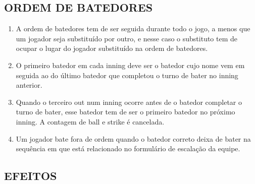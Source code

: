 \subsection{ORDEM DE BATEDORES }
\begin{multicols}{2}
	
	\begin{enumerate}[label=\alph*)]
		\item A ordem de batedores tem de ser seguida durante todo o jogo, a menos que um jogador seja substitu\'ido por outro, e nesse caso o substituto tem de ocupar o lugar do jogador substitu\'ido na ordem de batedores. 
		
		\item  O primeiro batedor em cada \gls{inning} deve ser o batedor cujo nome vem em seguida ao do \'ultimo batedor que completou o turno de bater no \gls{inning} anterior. 
		
		\item  Quando o terceiro \gls{out} num \gls{inning} ocorre antes de o batedor completar o turno de bater, esse batedor tem de ser o primeiro batedor no pr\'oximo \gls{inning}. A contagem de \gls{ball} e \gls{strike} \'e cancelada. 
		
		\item  Um jogador bate fora de ordem quando o batedor correto deixa de bater na sequ\^encia em que est\'a relacionado no formul\'ario de escala\c{c}\~ao da equipe. 
	\end{enumerate}
	
\end{multicols}

\subsection*{EFEITOS}

